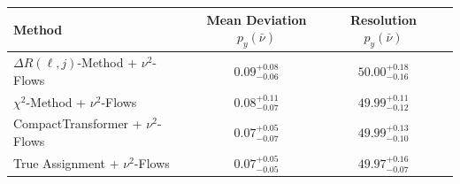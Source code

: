     \begin{tabular}{lccc}
        \toprule
        Method & Mean Deviation $p_{y}(\bar{\nu})$ & Resolution $p_{y}(\bar{\nu})$ \\
        \midrule
        $\Delta R(\ell,j)$-Method + $\nu^2$-Flows & $0.09^{+0.08}_{-0.06}$ & $50.00^{+0.18}_{-0.16}$ \\
        $\chi^2$-Method + $\nu^2$-Flows & $0.08^{+0.11}_{-0.07}$ & $49.99^{+0.11}_{-0.12}$ \\
        CompactTransformer + $\nu^2$-Flows & $0.07^{+0.05}_{-0.07}$ & $49.99^{+0.13}_{-0.10}$ \\
        True Assignment + $\nu^2$-Flows & $0.07^{+0.05}_{-0.05}$ & $49.97^{+0.16}_{-0.07}$ \\
        \bottomrule
    \end{tabular}